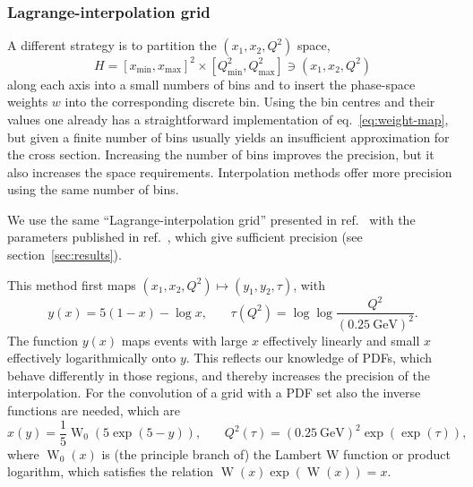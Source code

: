 \subsubsection{Lagrange-interpolation grid}

A different strategy is to partition the $(x_1, x_2, Q^2)$ space,
\begin{equation}
H = [x_\mathrm{min},x_\mathrm{max}]^2 \times [Q^2_\mathrm{min}, Q^2_\mathrm{max}] \ni (x_1, x_2, Q^2)
\end{equation}
along each axis into a small numbers of bins and to insert the phase-space weights $w$ into the corresponding discrete bin.
Using the bin centres and their values one already has a straightforward implementation of eq.~\eqref{eq:weight-map}, but given a finite number of bins usually yields an insufficient approximation for the cross section.
Increasing the number of bins improves the precision, but it also increases the space requirements.
Interpolation methods offer more precision using the same number of bins.

We use the same \enquote{Lagrange-interpolation grid} presented in ref.~\cite{Carli:2010rw} with the parameters published in ref.~\cite{Bertone:2014zva}, which give sufficient precision (see section~\ref{sec:results}).

This method first maps $(x_1, x_2, Q^2) \mapsto (y_1, y_2, \tau)$, with
\begin{equation}
y(x) = 5 (1-x) - \log x \text{,} \qquad \tau (Q^2) = \log \log \frac{Q^2}{(\SI{0.25}{\giga\electronvolt})^2} \text{.}
\label{eq:maps}
\end{equation}
The function $y(x)$ maps events with large $x$ effectively linearly and small $x$ effectively logarithmically onto $y$.
This reflects our knowledge of PDFs, which behave differently in those regions, and thereby increases the precision of the interpolation.
For the convolution of a grid with a PDF set also the inverse functions are needed, which are
\begin{equation}
x(y) = \frac{1}{5} \operatorname{W}_0 (5 \exp (5-y)) \text{,} \qquad Q^2 (\tau) = (\SI{0.25}{\giga\electronvolt})^2 \exp (\exp (\tau)) \text{,}
\end{equation}
where $\operatorname{W}_0 (x)$ is (the principle branch of) the Lambert W function or product logarithm, which satisfies the relation $\operatorname{W} (x) \exp (\operatorname{W} (x)) = x$.


